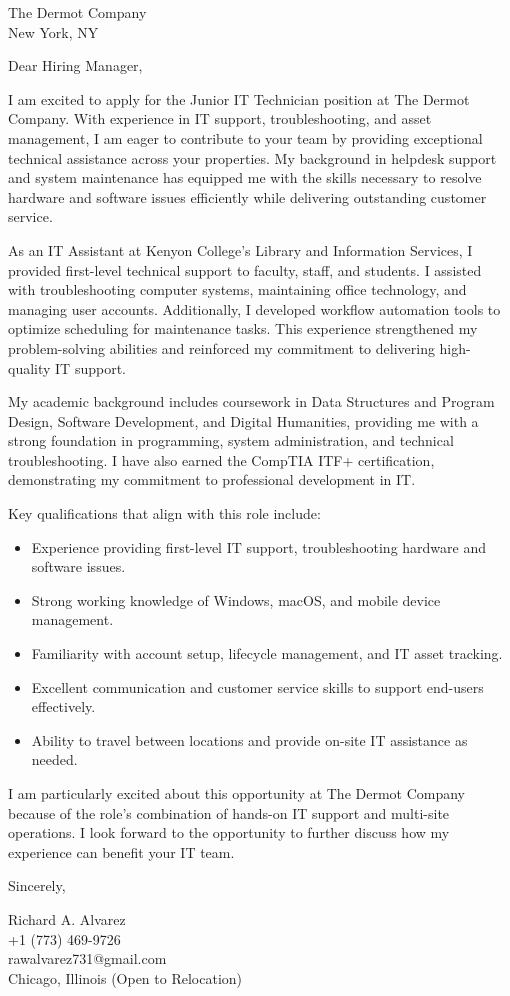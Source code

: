 \documentclass[a4paper,10pt]{letter}
\begin{document}
\begin{letter}{
The Dermot Company \\
New York, NY}

\opening{Dear Hiring Manager,}

I am excited to apply for the Junior IT Technician position at The Dermot Company. With experience in IT support, troubleshooting, and asset management, I am eager to contribute to your team by providing exceptional technical assistance across your properties. My background in helpdesk support and system maintenance has equipped me with the skills necessary to resolve hardware and software issues efficiently while delivering outstanding customer service.

As an IT Assistant at Kenyon College’s Library and Information Services, I provided first-level technical support to faculty, staff, and students. I assisted with troubleshooting computer systems, maintaining office technology, and managing user accounts. Additionally, I developed workflow automation tools to optimize scheduling for maintenance tasks. This experience strengthened my problem-solving abilities and reinforced my commitment to delivering high-quality IT support.

My academic background includes coursework in Data Structures and Program Design, Software Development, and Digital Humanities, providing me with a strong foundation in programming, system administration, and technical troubleshooting. I have also earned the CompTIA ITF+ certification, demonstrating my commitment to professional development in IT.

Key qualifications that align with this role include:
\begin{itemize}
    \item Experience providing first-level IT support, troubleshooting hardware and software issues.
    \item Strong working knowledge of Windows, macOS, and mobile device management.
    \item Familiarity with account setup, lifecycle management, and IT asset tracking.
    \item Excellent communication and customer service skills to support end-users effectively.
    \item Ability to travel between locations and provide on-site IT assistance as needed.
\end{itemize}

I am particularly excited about this opportunity at The Dermot Company because of the role’s combination of hands-on IT support and multi-site operations. I look forward to the opportunity to further discuss how my experience can benefit your IT team.

\closing{Sincerely,}

Richard A. Alvarez \\
+1 (773) 469-9726 \\
rawalvarez731@gmail.com \\
Chicago, Illinois (Open to Relocation)

\end{letter}
\end{document}
